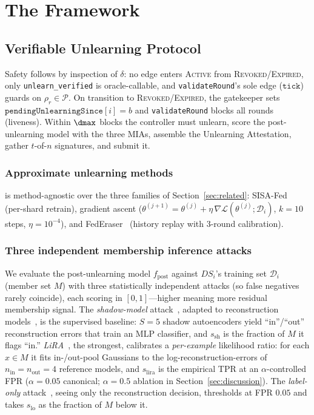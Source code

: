 \section{The \sysname Framework}
\label{sec:framework}

\subsection{Verifiable Unlearning Protocol}
\label{sec:framework-vup}

Safety follows by inspection of $\delta$: no edge enters \textsc{Active}
from \textsc{Revoked}/\textsc{Expired}, only \texttt{unlearn\_verified}
is oracle-callable, and \texttt{validateRound}'s sole edge
($\mathtt{tick}$) guards on $\rho_r\in\mathcal{P}$. On transition to
\textsc{Revoked}/\textsc{Expired}, the gatekeeper sets
$\mathtt{pendingUnlearningSince}[i]=b$ and \texttt{validateRound} blocks
all rounds (liveness). Within $\dmax$ blocks the controller must
unlearn, score the post-unlearning model with the three MIAs, assemble
the Unlearning Attestation, gather $t$-of-$n$ signatures, and submit
it.

\subsubsection{Approximate unlearning methods}

\sysname is method-agnostic over the three families of
Section~\ref{sec:related}: SISA-Fed~\cite{bourtoule2021sisa} (per-shard
retrain), gradient ascent
($\theta^{(j+1)}=\theta^{(j)}+\eta\,\nabla\mathcal{L}(\theta^{(j)};
\mathcal{D}_i)$, $k=10$ steps, $\eta=10^{-4}$), and
FedEraser~\cite{liu2021federaser} (history replay with 3-round
calibration).

\subsubsection{Three independent membership inference attacks}

We evaluate the post-unlearning model $f_{\mathrm{post}}$ against
$\mathit{DS}_i$'s training set $\mathcal{D}_i$ (member set $M$) with
three statistically independent attacks (so false negatives rarely
coincide), each scoring in $[0,1]$---higher meaning more residual
membership signal. The \emph{shadow-model}
attack~\cite{shokri2017mia}, adapted to reconstruction
models~\cite{hilprecht2019monte}, is the supervised baseline: $S=5$
shadow autoencoders yield ``in''/``out'' reconstruction errors that
train an MLP classifier, and $s_{\mathrm{sh}}$ is the fraction of $M$ it
flags ``in.'' \emph{LiRA}~\cite{carlini2022lira}, the strongest, calibrates a
\emph{per-example} likelihood ratio: for each $x\in M$ it fits
in-/out-pool Gaussians to the log-reconstruction-errors of
$n_{\mathrm{in}}=n_{\mathrm{out}}=4$ reference models, and
$s_{\mathrm{lira}}$ is the empirical TPR at an $\alpha$-controlled FPR
($\alpha=0.05$ canonical; $\alpha=0.5$ ablation in
Section~\ref{sec:discussion}). The \emph{label-only}
attack~\cite{choquettechoo2021labelonly}, seeing only the
reconstruction decision, thresholds at FPR $0.05$ and takes
$s_{\mathrm{lo}}$ as the fraction of $M$ below it.

